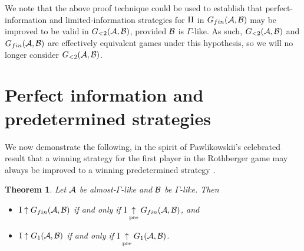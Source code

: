 \documentclass{amsart}
\theoremstyle{plain}
\newtheorem{theorem}{Theorem}
\theoremstyle{definition}
\theoremstyle{remark}
\theoremstyle{plain}
\theoremstyle{definition}
\theoremstyle{remark}
\begin{document}
We note that the above proof technique could be
used to establish that perfect-information and
limited-information strategies for \(\mathrm{II}\) in
\(G_{fin}(\mathcal{A},\mathcal{B})\) may be improved to
be valid in \(G_{<2}(\mathcal{A},\mathcal{B})\), provided
\(\mathcal{B}\) is \(\Gamma\)-like. As such,
\(G_{<2}(\mathcal{A},\mathcal{B})\) and \(G_{fin}(\mathcal{A},\mathcal{B})\)
are effectively equivalent games under this hypothesis,
so we will no longer consider \(G_{<2}(\mathcal{A},\mathcal{B})\).

\section{Perfect information and predetermined strategies}

We now demonstrate the following, in the spirit of Pawlikowskii's celebrated
result that a winning strategy for the first player in the Rothberger game
may always be improved to a winning predetermined strategy \cite{MR1279482}.

\begin{theorem}\label{pawlikowskii}
Let \(\mathcal{A}\) be almost-\(\Gamma\)-like and \(\mathcal{B}\) be \(\Gamma\)-like. Then
\begin{itemize}
\item \(\mathrm{I}\uparrow G_{fin}(\mathcal{A},\mathcal{B})\) if and only if
\(\mathrm{I}\underset{\text{pre}}{\uparrow} G_{fin}(\mathcal{A},\mathcal{B})\), and
\item \(\mathrm{I}\uparrow G_1(\mathcal{A},\mathcal{B})\) if and only if
\(\mathrm{I}\underset{\text{pre}}{\uparrow} G_1(\mathcal{A},\mathcal{B})\).
\end{itemize}
\end{theorem}
\end{document}
